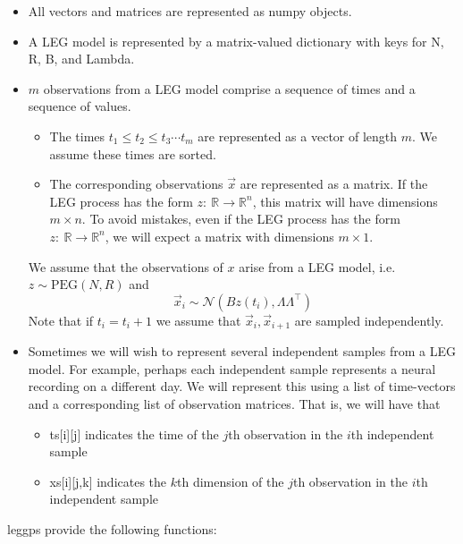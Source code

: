 \documentclass{article}
\theoremstyle{definition}
\newcommand{\PEG}{\mathrm{PEG}}
\begin{document}
\begin{itemize}
    \item All vectors and matrices are represented as numpy objects.
    \item A LEG model is represented by a matrix-valued dictionary with keys for N, R, B, and Lambda.
    \item $m$ observations from a LEG model comprise a sequence of times and a sequence of values.  
    \begin{itemize}
        \item The times $t_1 \leq t_2 \leq t_3 \cdots t_m$ are represented as a vector of length $m$.  We assume these times are sorted.  
        \item The corresponding observations $\vec x$ are represented as a matrix.  If the LEG process has the form $z:\ \mathbb{R}\rightarrow \mathbb{R}^n$, this matrix will have dimensions $m \times n$.  To avoid mistakes, even if the LEG process has the form $z:\ \mathbb{R}\rightarrow \mathbb{R}^n$, we will expect a matrix with dimensions $m \times 1$.  
    \end{itemize}
    We assume that the observations of $x$ arise from a LEG model, i.e. $z \sim \PEG(N,R)$ and
    \[
    \vec x_i \sim \mathcal{N}(Bz(t_i),\Lambda \Lambda^\top)
    \]
    Note that if $t_i=t_i+1$ we assume that $\vec x_i,\vec x_{i+1}$ are sampled independently.
    \item Sometimes we will wish to represent several independent samples from a LEG model.  For example, perhaps each independent sample represents a neural recording on a different day.  We will represent this using a list of time-vectors and a corresponding list of observation matrices.  That is, we will have that
    \begin{itemize}
        \item ts[i][j] indicates the time of the $j$th observation in the $i$th independent sample
        \item xs[i][j,k] indicates the $k$th dimension of the $j$th observation in the $i$th independent sample
    \end{itemize}
\end{itemize}

leggps provide the following functions:
\end{document}

